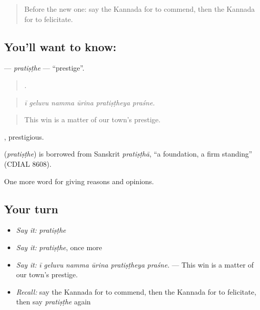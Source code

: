 \label{lesson:KA-C389-pratisthe}



\begin{quote}
Before the new one: say the Kannada for to commend, then the Kannada for to felicitate.
\end{quote}

\subsection*{You'll want to know: }
\textbf{} — \emph{pratiṣṭhe} — \textquotedblleft{}prestige\textquotedblright{}.

\begin{quote}
     .
\end{quote}

\begin{quote}
\emph{ī geluvu namma ūrina pratiṣṭheya praśne.}
\end{quote}

\begin{quote}
This win is a matter of our town's prestige.
\end{quote}

, prestigious.

\begin{cousinweb}
\textbf{} (\emph{pratiṣṭhe}) is borrowed from Sanskrit \emph{pratiṣṭhā}, \textquotedblleft{}a foundation, a firm standing\textquotedblright{} (CDIAL 8608).
\end{cousinweb}

\begin{grammarlens}[title={What you've built}]
One more word for giving reasons and opinions.
\end{grammarlens}

\subsection*{Your turn}
\begin{itemize}
\raggedright
  \item \emph{Say it:} \emph{pratiṣṭhe}
  \item \emph{Say it:} \emph{pratiṣṭhe}, once more
  \item \emph{Say it:} \emph{ī geluvu namma ūrina pratiṣṭheya praśne.} — This win is a matter of our town's prestige.
  \item \emph{Recall:} say the Kannada for to commend, then the Kannada for to felicitate, then say \emph{pratiṣṭhe} again
\end{itemize}

